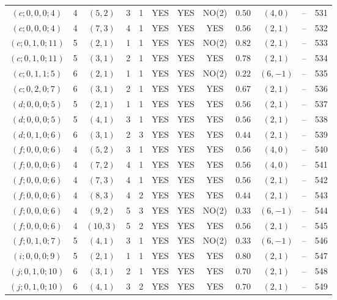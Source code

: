 \begin{longtable}{|c|c|c|c|c|c|c|c|c|c|c|c|}
$(c;0,0,0;4)$ & 4 & $(5,2)$ & 3 & 1 & YES & YES & NO(2) & $0.50$ & $(4,0)$ & -- & 531\\
$(c;0,0,0;4)$ & 4 & $(7,3)$ & 4 & 1 & YES & YES & YES & $0.56$ & $(2,1)$ & -- & 532\\
$(c;0,1,0;11)$ & 5 & $(2,1)$ & 1 & 1 & YES & YES & NO(2) & $0.82$ & $(2,1)$ & -- & 533\\
$(c;0,1,0;11)$ & 5 & $(3,1)$ & 2 & 1 & YES & YES & YES & $0.78$ & $(2,1)$ & -- & 534\\
$(c;0,1,1;5)$ & 6 & $(2,1)$ & 1 & 1 & YES & YES & NO(2) & $0.22$ & $(6,-1)$ & -- & 535\\
$(c;0,2,0;7)$ & 6 & $(3,1)$ & 2 & 1 & YES & YES & YES & $0.67$ & $(2,1)$ & -- & 536\\
$(d;0,0,0;5)$ & 5 & $(2,1)$ & 1 & 1 & YES & YES & YES & $0.56$ & $(2,1)$ & -- & 537\\
$(d;0,0,0;5)$ & 5 & $(4,1)$ & 3 & 1 & YES & YES & YES & $0.56$ & $(2,1)$ & -- & 538\\
$(d;0,1,0;6)$ & 6 & $(3,1)$ & 2 & 3 & YES & YES & YES & $0.44$ & $(2,1)$ & -- & 539\\
$(f;0,0,0;6)$ & 4 & $(5,2)$ & 3 & 1 & YES & YES & YES & $0.56$ & $(4,0)$ & -- & 540\\
$(f;0,0,0;6)$ & 4 & $(7,2)$ & 4 & 1 & YES & YES & YES & $0.56$ & $(4,0)$ & -- & 541\\
$(f;0,0,0;6)$ & 4 & $(7,3)$ & 4 & 1 & YES & YES & YES & $0.56$ & $(2,1)$ & -- & 542\\
$(f;0,0,0;6)$ & 4 & $(8,3)$ & 4 & 2 & YES & YES & YES & $0.44$ & $(2,1)$ & -- & 543\\
$(f;0,0,0;6)$ & 4 & $(9,2)$ & 5 & 3 & YES & YES & NO(2) & $0.33$ & $(6,-1)$ & -- & 544\\
$(f;0,0,0;6)$ & 4 & $(10,3)$ & 5 & 2 & YES & YES & YES & $0.56$ & $(2,1)$ & -- & 545\\
$(f;0,1,0;7)$ & 5 & $(4,1)$ & 3 & 1 & YES & YES & NO(2) & $0.33$ & $(6,-1)$ & -- & 546\\
$(i;0,0,0;9)$ & 5 & $(2,1)$ & 1 & 1 & YES & YES & YES & $0.80$ & $(2,1)$ & -- & 547\\
$(j;0,1,0;10)$ & 6 & $(3,1)$ & 2 & 1 & YES & YES & YES & $0.70$ & $(2,1)$ & -- & 548\\
$(j;0,1,0;10)$ & 6 & $(4,1)$ & 3 & 2 & YES & YES & YES & $0.70$ & $(2,1)$ & -- & 549
\end{longtable}

